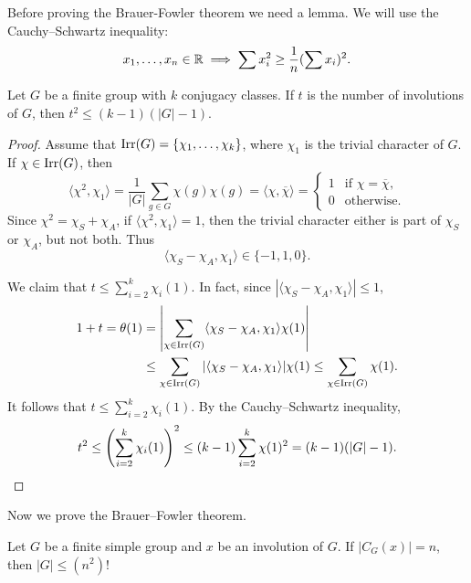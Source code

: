 Before proving the Brauer-Fowler theorem we
need a lemma. We will use the Cauchy--Schwartz inequality: 
\[
x_1,\dots,x_n\in\mathbb{R}\implies
\sum x_i^2\geq\frac{1}{n}(\sum x_i)^2.
\]

\begin{lemma}
    Let $G$ be a finite group with $k$ conjugacy classes. 
    If $t$ is the number of involutions of $G$, then
    $t^2\leq (k-1)(|G|-1)$. 
\end{lemma}

\begin{proof}
    Assume that $\operatorname{Irr}(G)=\{\chi_1,\dots,\chi_k\}$, where $\chi_1$ is the
    trivial character of $G$. 
    If $\chi\in\operatorname{Irr}(G)$, then 
    \[
        \langle\chi^2,\chi_1\rangle=\frac{1}{|G|}\sum_{g\in G}\chi(g)\chi(g)=\langle\chi,\overline{\chi}\rangle=\begin{cases}
        1 & \text{if $\chi=\overline{\chi}$},\\
        0 & \text{otherwise}.
        \end{cases}
    \]
    Since $\chi^2=\chi_S+\chi_A$, if $\langle\chi^2,\chi_1\rangle=1$, then
    the trivial character either is part of $\chi_S$ or $\chi_A$, but not both. 
    Thus
    \[
    \langle\chi_S-\chi_A,\chi_1\rangle\in\{-1,1,0\}.
    \]
    
    We claim that 
    $t\leq\sum_{i=2}^k\chi_i(1)$. In fact, since 
    $|\langle\chi_S-\chi_A,\chi_1\rangle|\leq 1$, 
    \begin{align*}
        1+t=\theta(1)
        &=\left|\sum_{\chi\in\operatorname{Irr}(G)}\langle\chi_S-\chi_A,\chi_1\rangle\chi(1)\right|\\
        &\leq\sum_{\chi\in\operatorname{Irr}(G)}|\langle\chi_S-\chi_A,\chi_1\rangle|\chi(1)
        \leq\sum_{\chi\in\operatorname{Irr}(G)}\chi(1).
    \end{align*}
    It follows that $t\leq\sum_{i=2}^k\chi_i(1)$. 
    By the Cauchy--Schwartz inequality, 
    \[
        t^2\leq\left(\sum_{i=2}^k\chi_i(1)\right)^2
        \leq(k-1)\sum_{i=2}^k\chi(1)^2=(k-1)(|G|-1).\qedhere
    \]
\end{proof}

Now we prove the Brauer--Fowler theorem. 

\begin{theorem}
    Let $G$ be a finite simple group and $x$ be an involution of $G$. If $|C_G(x)|=n$, then $|G|\leq (n^2)!$	
\end{theorem}

